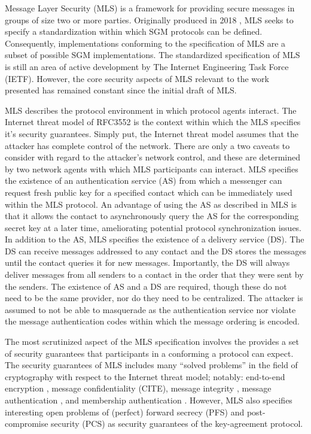 Message Layer Security (MLS) \autocite{Omara2020} is a framework for providing secure messages in groups of size two or more parties.
Originally produced in 2018 \autocite{ietf-mls-architecture-02}, MLS seeks to specify a standardization within which SGM protocols can be defined.
Consequently, implementations conforming to the specification of MLS are a subset of possible SGM implementations.
The standardized specification of MLS is still an area of active development by The Internet Engineering Task Force (IETF).
However, the core security aspects of MLS relevant to the work presented has remained constant since the initial draft of MLS.

MLS describes the protocol environment in which protocol agents interact.
The Internet threat model of RFC3552 \autocite{rescorla2003rfc3552} is the context within which the MLS specifies it's security guarantees.
Simply put, the Internet threat model assumes that the attacker has complete control of the network.
There are only a two caveats to consider with regard to the attacker's network control, and these are determined by two network agents with which MLS participants can interact.
MLS specifies the existence of an authentication service (AS) from which a messenger can request fresh public key for a specified contact which can be immediately used within the MLS protocol.
An advantage of using the AS as described in MLS is that it allows the contact to asynchronously query the AS for the corresponding secret key at a later time, ameliorating potential protocol synchronization issues.
In addition to the AS, MLS specifies the existence of a delivery service (DS).
The DS can receive messages addressed to any contact and the DS stores the messages until the contact queries it for new messages.
Importantly, the DS will always deliver messages from all senders to a contact in the order that they were sent by the senders.
The existence of AS and a DS are required, though these do not need to be the same provider, nor do they need to be centralized.
The attacker is assumed to not be able to masquerade as the authentication service nor violate the message authentication codes within which the message ordering is encoded.

The most scrutinized aspect of the MLS specification involves the provides a set of security guarantees that participants in a conforming a protocol can expect.
The security guarantees of MLS includes many ``solved problems'' in the field of cryptography with respect to the Internet threat model; notably: end-to-end encryption \autocite{padlipsky1978limitations}, message confidentiality (CITE), message integrity \autocite{voydock1983security}, message authentication \autocite{jueneman1983message}, and membership authentication \autocite{chaum1985showing}.
However, MLS also specifies interesting open problems of (perfect) forward secrecy (PFS) \autocite{gunther1989identity} and post-compromise security (PCS) \autocite{cohn2016post} as security guarantees of the key-agreement protocol.

